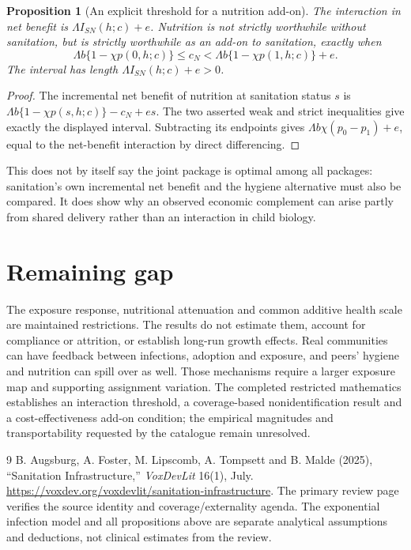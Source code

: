 \documentclass[11pt,a4paper]{article}
\newtheorem{proposition}[theorem]{Proposition}
\theoremstyle{definition}
\theoremstyle{remark}
\begin{document}
\begin{proposition}[An explicit threshold for a nutrition add-on]
The interaction in net benefit is $\Lambda I_{SN}(h;c)+e$. Nutrition is not strictly worthwhile without sanitation, but is strictly worthwhile as an add-on to sanitation, exactly when
\[
 \Lambda b\{1-\chi p(0,h;c)\}\leq c_N
       <\Lambda b\{1-\chi p(1,h;c)\}+e.
\]
The interval has length $\Lambda I_{SN}(h;c)+e>0$.
\end{proposition}
\begin{proof}
The incremental net benefit of nutrition at sanitation status $s$ is
$\Lambda b\{1-\chi p(s,h;c)\}-c_N+es$.
The two asserted weak and strict inequalities give exactly the displayed interval. Subtracting its endpoints gives $\Lambda b\chi(p_0-p_1)+e$, equal to the net-benefit interaction by direct differencing.
\end{proof}

This does not by itself say the joint package is optimal among all packages: sanitation's own incremental net benefit and the hygiene alternative must also be compared. It does show why an observed economic complement can arise partly from shared delivery rather than an interaction in child biology.

\section{Remaining gap}
The exposure response, nutritional attenuation and common additive health scale are maintained restrictions. The results do not estimate them, account for compliance or attrition, or establish long-run growth effects. Real communities can have feedback between infections, adoption and exposure, and peers' hygiene and nutrition can spill over as well. Those mechanisms require a larger exposure map and supporting assignment variation. The completed restricted mathematics establishes an interaction threshold, a coverage-based nonidentification result and a cost-effectiveness add-on condition; the empirical magnitudes and transportability requested by the catalogue remain unresolved.

\begin{thebibliography}{9}
 B. Augsburg, A. Foster, M. Lipscomb, A. Tompsett and B. Malde (2025), ``Sanitation Infrastructure,'' \emph{VoxDevLit} 16(1), July. \url{https://voxdev.org/voxdevlit/sanitation-infrastructure}. The primary review page verifies the source identity and coverage/externality agenda. The exponential infection model and all propositions above are separate analytical assumptions and deductions, not clinical estimates from the review.
\end{thebibliography}
\end{document}

